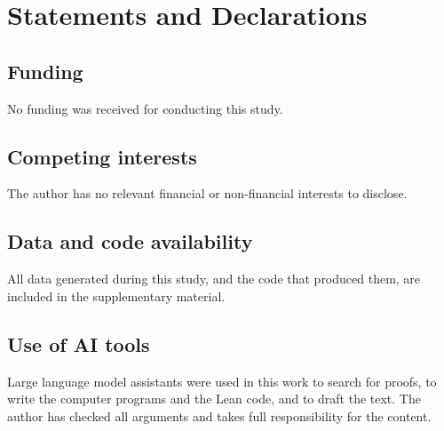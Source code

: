 \documentclass[11pt,a4paper]{article}
\theoremstyle{definition}
\begin{document}


\section*{Statements and Declarations}
\subsection*{Funding}
No funding was received for conducting this study.

\subsection*{Competing interests}
The author has no relevant financial or non-financial interests to disclose.

\subsection*{Data and code availability}
All data generated during this study, and the code that produced them, are
included in the supplementary material.

\subsection*{Use of AI tools}
Large language model assistants were used in this work to search for
proofs, to write the computer programs and the Lean code, and to draft the
text. The author has checked all arguments and takes full responsibility for
the content.
\end{document}
